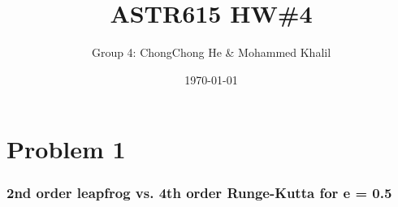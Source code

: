 
\usepackage{graphicx}
\usepackage{subcaption}



\title{ASTR615 HW\#4}
\author{Group 4: ChongChong He \& Mohammed Khalil\\}
\date{\today}
\maketitle


\section{Problem 1}

\subsubsection*{2nd order leapfrog vs. 4th order Runge-Kutta for e = 0.5}

